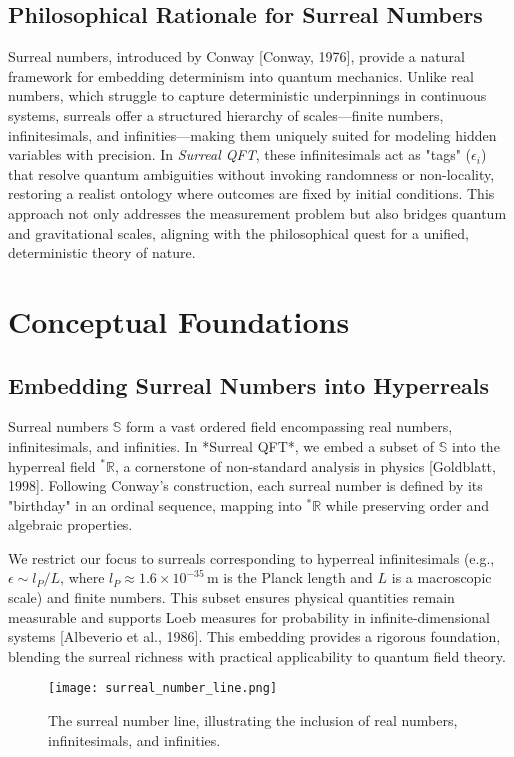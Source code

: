 \documentclass{article}
\begin{document}
\subsection{Philosophical Rationale for Surreal Numbers}
Surreal numbers, introduced by Conway [Conway, 1976], provide a natural framework for embedding determinism into quantum mechanics. Unlike real numbers, which struggle to capture deterministic underpinnings in continuous systems, surreals offer a structured hierarchy of scales—finite numbers, infinitesimals, and infinities—making them uniquely suited for modeling hidden variables with precision. In \textit{Surreal QFT}, these infinitesimals act as "tags" (\(\epsilon_i\)) that resolve quantum ambiguities without invoking randomness or non-locality, restoring a realist ontology where outcomes are fixed by initial conditions. This approach not only addresses the measurement problem but also bridges quantum and gravitational scales, aligning with the philosophical quest for a unified, deterministic theory of nature.

\section{Conceptual Foundations}
\subsection{Embedding Surreal Numbers into Hyperreals}
Surreal numbers \(\mathbb{S}\) form a vast ordered field encompassing real numbers, infinitesimals, and infinities. In *Surreal QFT*, we embed a subset of \(\mathbb{S}\) into the hyperreal field \({}^*\mathbb{R}\), a cornerstone of non-standard analysis in physics [Goldblatt, 1998]. Following Conway's construction, each surreal number is defined by its "birthday" in an ordinal sequence, mapping into \({}^*\mathbb{R}\) while preserving order and algebraic properties.

We restrict our focus to surreals corresponding to hyperreal infinitesimals (e.g., \(\epsilon \sim l_P / L\), where \(l_P \approx 1.6 \times 10^{-35} \, \text{m}\) is the Planck length and \(L\) is a macroscopic scale) and finite numbers. This subset ensures physical quantities remain measurable and supports Loeb measures for probability in infinite-dimensional systems [Albeverio et al., 1986]. This embedding provides a rigorous foundation, blending the surreal richness with practical applicability to quantum field theory.

\begin{figure}[h]
    \centering
    \texttt{[image: surreal\_number\_line.png]}
    \caption{The surreal number line, illustrating the inclusion of real numbers, infinitesimals, and infinities.}
    \label{fig:surreal_line}
\end{figure}
\end{document}
